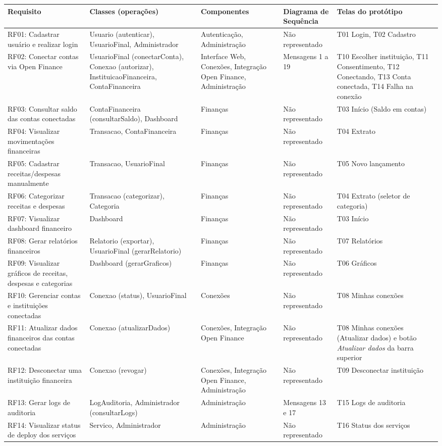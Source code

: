 \documentclass[11pt,a4paper]{article}
\newcommand{\hd}[1]{\cellcolor{headfill}\textbf{#1}}
\begin{document}
\begingroup\small
\begin{xltabular}{\linewidth}{|L{2.8cm}|L{3.7cm}|L{2.6cm}|L{2.2cm}|Y|}
\hline
\hd{Requisito} & \hd{Classes (operações)} & \hd{Componentes} & \hd{Diagrama de Sequência} & \hd{Telas do protótipo} \\ \hline
\endhead
RF01: Cadastrar usuário e realizar login & Usuario (autenticar), UsuarioFinal, Administrador & Autenticação, Administração & Não representado & T01 Login, T02 Cadastro \\ \hline
RF02: Conectar contas via Open Finance & UsuarioFinal (conectarConta), Conexao (autorizar), InstituicaoFinanceira, ContaFinanceira & Interface Web, Conexões, Integração Open Finance, Administração & Mensagens 1 a 19 & T10 Escolher instituição, T11 Consentimento, T12 Conectando, T13 Conta conectada, T14 Falha na conexão \\ \hline
RF03: Consultar saldo das contas conectadas & ContaFinanceira (consultarSaldo), Dashboard & Finanças & Não representado & T03 Início (Saldo em contas) \\ \hline
RF04: Visualizar movimentações financeiras & Transacao, ContaFinanceira & Finanças & Não representado & T04 Extrato \\ \hline
RF05: Cadastrar receitas/despesas manualmente & Transacao, UsuarioFinal & Finanças & Não representado & T05 Novo lançamento \\ \hline
RF06: Categorizar receitas e despesas & Transacao (categorizar), Categoria & Finanças & Não representado & T04 Extrato (seletor de categoria) \\ \hline
RF07: Visualizar dashboard financeiro & Dashboard & Finanças & Não representado & T03 Início \\ \hline
RF08: Gerar relatórios financeiros & Relatorio (exportar), UsuarioFinal (gerarRelatorio) & Finanças & Não representado & T07 Relatórios \\ \hline
RF09: Visualizar gráficos de receitas, despesas e categorias & Dashboard (gerarGraficos) & Finanças & Não representado & T06 Gráficos \\ \hline
RF10: Gerenciar contas e instituições conectadas & Conexao (status), UsuarioFinal & Conexões & Não representado & T08 Minhas conexões \\ \hline
RF11: Atualizar dados financeiros das contas conectadas & Conexao (atualizarDados) & Conexões, Integração Open Finance & Não representado & T08 Minhas conexões (Atualizar dados) e botão \emph{Atualizar dados} da barra superior \\ \hline
RF12: Desconectar uma instituição financeira & Conexao (revogar) & Conexões, Integração Open Finance, Administração & Não representado & T09 Desconectar instituição \\ \hline
RF13: Gerar logs de auditoria & LogAuditoria, Administrador (consultarLogs) & Administração & Mensagens 13 e 17 & T15 Logs de auditoria \\ \hline
RF14: Visualizar status de deploy dos serviços & Servico, Administrador & Administração & Não representado & T16 Status dos serviços \\ \hline
\end{xltabular}
\endgroup
\end{document}
